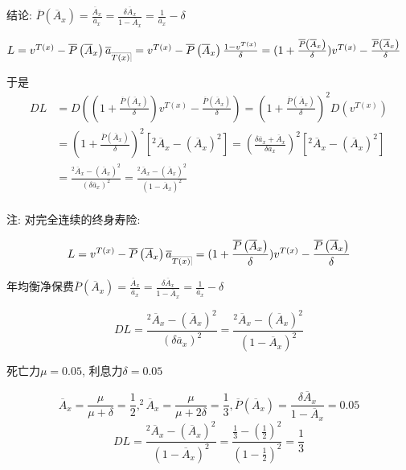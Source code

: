 \documentclass[a4paper,10pt]{ctexbook}
\makeatletter
\DeclareRobustCommand{\annu}[1]{_{%
    \def\arraystretch{0}%
    \setlength\arraycolsep{1pt}%
    \setlength\arrayrulewidth{.2pt}%
    \begin{array}[b]{@{}c|}\hline
        \\[\arraycolsep]%
        \scriptstyle #1%
    \end{array}%
}}
\makeatother
\begin{document}
结论: $\overline{P}\left( \overline{A}_x \right)=\frac{\overline A_x}{\overline a_x}=\frac{\delta\overline A_x}{1-\overline A_x}=\frac{1}{\overline a_x}-\delta$

$L=v^{T(x)}-\overline{P}\left( \overline{A}_x \right)\overline a_{\annu {T(x)}}=v^{T(x)}-\overline{P}\left( \overline{A}_x \right)\frac{1-v^{T(x)}}{\delta}=(1+\frac{\overline{P}\left( \overline{A}_x \right)}{\delta})v^{T(x)}-\frac{\overline{P}\left( \overline{A}_x \right)}{\delta}$

于是
\begin{align*}
    DL & =D((1+\frac{\overline{P}\left( \overline{A}_x \right)}{\delta})v^{T(x)}-\frac{\overline{P}\left( \overline{A}_x \right)}{\delta})
    =(1+\frac{\overline{P}\left( \overline{A}_x \right)}{\delta})^2D(v^{T(x)})                                                                                                                                      \\
       & =(1+\frac{\overline{P}\left( \overline{A}_x \right)}{\delta})^2 [^2\overline A_x-(\overline A_x)^2]=(\frac{\delta\overline a_x+\overline A_x}{\delta \overline a_x})^2 [^2\overline A_x-(\overline A_x)^2] \\
       & =\frac{^2\overline A_x-(\overline A_x)^2}{(\delta\overline a_x)^2}=\frac{^2\overline A_x-(\overline A_x)^2}{(1-\overline A_x)^2}                                                                           \\
\end{align*}

注: 对完全连续的终身寿险:

$$L=v^{T(x)}-\overline{P}\left( \overline{A}_x \right)\overline a_{\annu {T(x)}}=(1+\frac{\overline{P}\left( \overline{A}_x \right)}{\delta})v^{T(x)}-\frac{\overline{P}\left( \overline{A}_x \right)}{\delta}$$

年均衡净保费$\overline{P}\left( \overline{A}_x \right)=\frac{\overline A_x}{\overline a_x}=\frac{\delta\overline A_x}{1-\overline A_x}=\frac{1}{\overline a_x}-\delta$

$$DL=\frac{^2\overline A_x-(\overline A_x)^2}{(\delta\overline a_x)^2}=\frac{^2\overline A_x-(\overline A_x)^2}{(1-\overline A_x)^2}$$
\begin{example}
    死亡力$\mu=0.05$, 利息力$\delta=0.05$
\end{example}

$$\overline A_x=\frac{\mu}{\mu+\delta}=\frac{1}{2},^2\overline A_x=\frac{\mu}{\mu+2\delta}=\frac{1}{3},\overline{P}\left( \overline{A}_x \right)=\frac{\delta\overline A_x}{1-\overline A_x}=0.05$$
$$DL=\frac{^2\overline A_x-(\overline A_x)^2}{(1-\overline A_x)^2}=\frac{\frac{1}{3}-(\frac{1}{2})^2}{(1-\frac{1}{2})^2}=\frac{1}{3}$$
\end{document}
